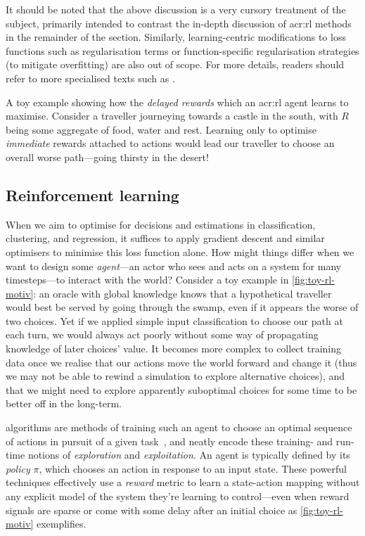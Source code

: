 It should be noted that the above discussion is a very cursory treatment of the subject, primarily intended to contrast the in-depth discussion of \gls{acr:rl} methods in the remainder of the section.
Similarly, learning-centric modifications to loss functions such as regularisation terms or function-specific regularisation strategies (to mitigate overfitting) are also out of scope.
For more details, readers should refer to more specialised texts such as \Textcite{DBLP:journals/siamrev/BottouCN18, DBLP:books/daglib/0040158}.

\begin{marginfigure}
	\centering
	\resizebox{0.9\linewidth}{!}{}
	\caption[A motivating example for MDPs in handling delayed rewards.]{A toy example showing how the \emph{delayed rewards} which an \gls{acr:rl} agent learns to maximise. Consider a traveller journeying towards a castle in the south, with $R$ being some aggregate of food, water and rest. Learning only to optimise \emph{immediate} rewards attached to actions would lead our traveller to choose an overall worse path---going thirsty in the desert!}\label{fig:toy-rl-motiv}
\end{marginfigure}

\subsection{Reinforcement learning}
When we aim to optimise for decisions and estimations in classification, clustering, and regression, it suffices to apply gradient descent and similar optimisers to minimise this loss function alone.
How might things differ when we want to design some \emph{agent}---an actor who sees and acts on a system for many timesteps---to interact with the world?
Consider a toy example in \cref{fig:toy-rl-motiv}: an oracle with global knowledge knows that a hypothetical traveller would best be served by going through the swamp, even if it appears the worse of two choices.
Yet if we applied simple input classification to choose our path at each turn, we would always act poorly without some way of propagating knowledge of later choices' value.
It becomes more complex to collect training data once we realise that our actions move the world forward and change it (thus we may not be able to rewind a simulation to explore alternative choices), and that we might need to explore apparently suboptimal choices for some time to be better off in the long-term.

 algorithms are methods of training such an agent to choose an optimal sequence of actions in pursuit of a given task~\parencite{RL2E}, and neatly encode these training- and run-time notions of \emph{exploration} and \emph{exploitation}.
An agent is typically defined by its \emph{policy} $\pi$, which chooses an action in response to an input state.
These powerful techniques effectively use a \emph{reward} metric to learn a state-action mapping without any explicit model of the system they're learning to control---even when reward signals are sparse or come with some delay after an initial choice as \cref{fig:toy-rl-motiv} exemplifies.

